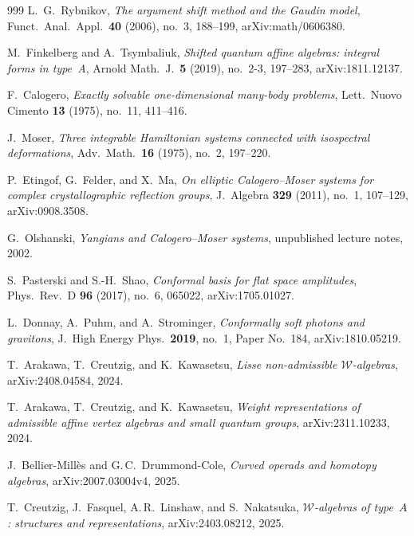 \documentclass[11pt]{memoir}
\begin{document}
\begin{thebibliography}{999}
L.~G.~Rybnikov, \emph{The argument shift method and the Gaudin model}, Funct.\ Anal.\ Appl.\ \textbf{40} (2006), no.~3, 188--199, arXiv:math/0606380.

M.~Finkelberg and A.~Tsymbaliuk, \emph{Shifted quantum affine algebras: integral forms in type~A}, Arnold Math.\ J.\ \textbf{5} (2019), no.~2-3, 197--283, arXiv:1811.12137.

F.~Calogero, \emph{Exactly solvable one-dimensional many-body problems}, Lett.\ Nuovo Cimento \textbf{13} (1975), no.~11, 411--416.

J.~Moser, \emph{Three integrable Hamiltonian systems connected with isospectral deformations}, Adv.\ Math.\ \textbf{16} (1975), no.~2, 197--220.

P.~Etingof, G.~Felder, and X.~Ma, \emph{On elliptic Calogero--Moser systems for complex crystallographic reflection groups}, J.\ Algebra \textbf{329} (2011), no.~1, 107--129, arXiv:0908.3508.

G.~Olshanski, \emph{Yangians and Calogero--Moser systems}, unpublished lecture notes, 2002.

S.~Pasterski and S.-H.~Shao, \emph{Conformal basis for flat space amplitudes}, Phys.\ Rev.\ D \textbf{96} (2017), no.~6, 065022, arXiv:1705.01027.

L.~Donnay, A.~Puhm, and A.~Strominger, \emph{Conformally soft photons and gravitons}, J.\ High Energy Phys.\ \textbf{2019}, no.~1, Paper No.~184, arXiv:1810.05219.


T.~Arakawa, T.~Creutzig, and K.~Kawasetsu, \emph{Lisse non-admissible $\mathcal{W}$-algebras}, arXiv:2408.04584, 2024.

T.~Arakawa, T.~Creutzig, and K.~Kawasetsu, \emph{Weight representations of admissible affine vertex algebras and small quantum groups}, arXiv:2311.10233, 2024.

J.~Bellier-Mill\`es and G.\,C.~Drummond-Cole, \emph{Curved operads and homotopy algebras}, arXiv:2007.03004v4, 2025.

T.~Creutzig, J.~Fasquel, A.\,R.~Linshaw, and S.~Nakatsuka, \emph{$\mathcal{W}$-algebras of type~$A$: structures and representations}, arXiv:2403.08212, 2025.


\end{thebibliography}
\end{document}
